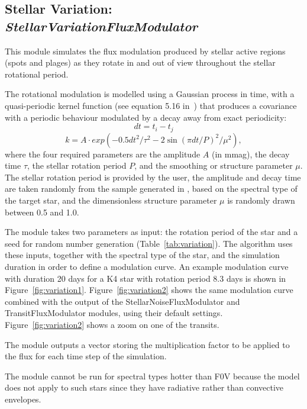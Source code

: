 \documentclass[11pt]{article}      %
\def\HCode#1{}
\def\htmlanchor#1{\HCode{<a id="#1"></a>}}
\begin{document}
\clearpage 
\htmlanchor{StellarVariationFluxModulator}
\subsection{Stellar Variation:  {\it StellarVariationFluxModulator}}
\label{sec:StellarVariationFluxModulator}

This module simulates the flux modulation produced by stellar active regions (spots and plages) as they rotate in and out of view throughout the stellar rotational period.

The rotational modulation is modelled using a Gaussian process in time, with a quasi-periodic kernel function (see equation 5.16 in~\cite{variation}) that produces a covariance with a periodic behaviour modulated by a decay away from exact periodicity:
$$dt = t_i - t_j$$
$$k = A\cdot exp(-0.5dt^2/\tau^2 - 2\sin(\pi dt/P)^2/\mu^2) ,$$
where the four required parameters are the amplitude $A$ (in mmag), the decay time $\tau$, the stellar rotation period $P$, and the smoothing or structure parameter $\mu$.
The stellar rotation period is provided by the user, the amplitude and decay time are taken randomly from the sample generated in \cite{HelenGiles}, based on the spectral type of the target star, and the dimensionless structure parameter $\mu$ is randomly drawn between 0.5 and 1.0.

The module takes two parameters as input: the rotation period of the star and a seed for random number generation (Table~\ref{tab:variation}). The algorithm uses these inputs, together with the spectral type of the star, and the simulation duration in order to define a modulation curve. An example modulation curve with duration 20 days for a K4 star with rotation period 8.3 days is shown in Figure~\ref{fig:variation1}. Figure~\ref{fig:variation2} shows the same modulation curve combined with the output of the StellarNoiseFluxModulator and TransitFluxModulator modules, using their default settings. Figure~\ref{fig:variation2} shows a zoom on one of the transits.

The module outputs a vector storing the multiplication factor to be applied to the flux for each time step of the simulation.

The module cannot be run for spectral types hotter than F0V because the model does not apply to such stars since they have radiative rather than convective envelopes.
\end{document}
